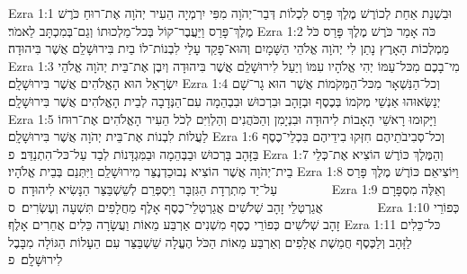 Ezra 1:1	וּבִשְׁנַת אַחַת לְכוֹרֶשׁ מֶלֶךְ פָּרַס לִכְלוֹת דְּבַר־יְהֹוָה מִפִּי יִרְמְיָה הֵעִיר יְהֹוָה אֶת־רוּחַ כֹּרֶשׁ מֶלֶךְ־פָּרַס וַיַּעֲבֶר־קוֹל בְּכל־מַלְכוּתוֹ וְגַם־בְּמִכְתָּב לֵאמֹר׃
Ezra 1:2	כֹּה אָמַר כֹּרֶשׁ מֶלֶךְ פָּרַס כֹּל מַמְלְכוֹת הָאָרֶץ נָתַן לִי יְהֹוָה אֱלֹהֵי הַשָּׁמָיִם וְהוּא־פָקַד עָלַי לִבְנוֹת־לוֹ בַיִת בִּירוּשָׁלַ͏ִם אֲשֶׁר בִּיהוּדָה׃
Ezra 1:3	מִי־בָכֶם מִכּל־עַמּוֹ יְהִי אֱלֹהָיו עִמּוֹ וְיַעַל לִירוּשָׁלַ͏ִם אֲשֶׁר בִּיהוּדָה וְיִבֶן אֶת־בֵּית יְהֹוָה אֱלֹהֵי יִשְׂרָאֵל הוּא הָאֱלֹהִים אֲשֶׁר בִּירוּשָׁלָ͏ִם׃
Ezra 1:4	וְכל־הַנִּשְׁאָר מִכּל־הַמְּקֹמוֹת אֲשֶׁר הוּא גָר־שָׁם יְנַשְּׂאוּהוּ אַנְשֵׁי מְקֹמוֹ בְּכֶסֶף וּבְזָהָב וּבִרְכוּשׁ וּבִבְהֵמָה עִם־הַנְּדָבָה לְבֵית הָאֱלֹהִים אֲשֶׁר בִּירוּשָׁלָ͏ִם׃
Ezra 1:5	וַיָּקוּמוּ רָאשֵׁי הָאָבוֹת לִיהוּדָה וּבִנְיָמִן וְהַכֹּהֲנִים וְהַלְוִיִּם לְכֹל הֵעִיר הָאֱלֹהִים אֶת־רוּחוֹ לַעֲלוֹת לִבְנוֹת אֶת־בֵּית יְהֹוָה אֲשֶׁר בִּירוּשָׁלָ͏ִם׃
Ezra 1:6	וְכל־סְבִיבֹתֵיהֶם חִזְּקוּ בִידֵיהֶם בִּכְלֵי־כֶסֶף בַּזָּהָב בָּרְכוּשׁ וּבַבְּהֵמָה וּבַמִּגְדָּנוֹת לְבַד עַל־כּל־הִתְנַדֵּב׃ {פ}
Ezra 1:7	וְהַמֶּלֶךְ כּוֹרֶשׁ הוֹצִיא אֶת־כְּלֵי בֵית־יְהֹוָה אֲשֶׁר הוֹצִיא נְבוּכַדְנֶצַּר מִירוּשָׁלַ͏ִם וַיִּתְּנֵם בְּבֵית אֱלֹהָיו׃
Ezra 1:8	וַיּוֹצִיאֵם כּוֹרֶשׁ מֶלֶךְ פָּרַס עַל־יַד מִתְרְדָת הַגִּזְבָּר וַיִּסְפְּרֵם לְשֵׁשְׁבַּצַּר הַנָּשִׂיא לִיהוּדָה׃ {ס}        
Ezra 1:9	וְאֵלֶּה מִסְפָּרָם אֲגַרְטְלֵי זָהָב שְׁלֹשִׁים אֲגַרְטְלֵי־כֶסֶף אָלֶף מַחֲלָפִים תִּשְׁעָה וְעֶשְׂרִים׃ {ס}        
Ezra 1:10	כְּפוֹרֵי זָהָב שְׁלֹשִׁים כְּפוֹרֵי כֶסֶף מִשְׁנִים אַרְבַּע מֵאוֹת וַעֲשָׂרָה כֵּלִים אֲחֵרִים אָלֶף׃
Ezra 1:11	כּל־כֵּלִים לַזָּהָב וְלַכֶּסֶף חֲמֵשֶׁת אֲלָפִים וְאַרְבַּע מֵאוֹת הַכֹּל הֶעֱלָה שֵׁשְׁבַּצַּר עִם הֵעָלוֹת הַגּוֹלָה מִבָּבֶל לִירוּשָׁלָ͏ִם׃ {פ}
